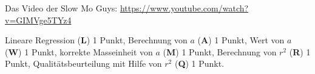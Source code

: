 \begin{diskussion}
Das Video der Slow Mo Guys:
\url{https://www.youtube.com/watch?v=GIMVge5TYz4}
\end{diskussion}

\begin{bewertung}
Lineare Regression ({\bf L}) 1 Punkt,
Berechnung von $a$ ({\bf A}) 1 Punkt,
Wert von $a$ ({\bf W}) 1 Punkt,
korrekte Masseinheit von $a$ ({\bf M}) 1 Punkt,
Berechnung von $r^2$ ({\bf R}) 1 Punkt,
Qualitätsbeurteilung mit Hilfe von $r^2$ ({\bf Q}) 1 Punkt.
\end{bewertung}


